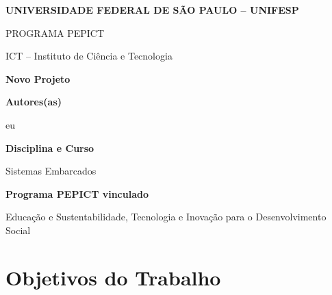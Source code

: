 \documentclass[12pt,a4paper]{article}
\begin{document}

\begin{center}

{\large \textbf{UNIVERSIDADE FEDERAL DE SÃO PAULO – UNIFESP}}

\vspace{0.3cm}

{\normalsize PROGRAMA PEPICT}

\vspace{0.3cm}

{\normalsize ICT – Instituto de Ciência e Tecnologia}

\vspace{1cm}

{\Large \textbf{Novo Projeto}}

\end{center}

\vspace{1cm}


\noindent
\textbf{Autores(as)}

eu

\vspace{0.7cm}


\noindent
\textbf{Disciplina e Curso}

Sistemas Embarcados

\vspace{0.7cm}


\noindent
\textbf{Programa PEPICT vinculado}

Educação e Sustentabilidade, Tecnologia e Inovação para o Desenvolvimento Social

\vspace{0.7cm}


\section*{Objetivos do Trabalho}
\end{document}
